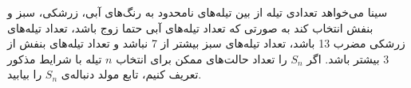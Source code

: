 \p              
  سینا می‌خواهد تعدادی تیله از بین تیله‌های نامحدود به رنگ‌های آبی، زرشکی، سبز و بنفش انتخاب کند به صورتی که تعداد تیله‌های آبی حتما زوج باشد، تعداد تیله‌های زرشکی مضرب 13 باشد، تعداد تیله‌های سبز بیشتر از 7 نباشد و تعداد تیله‌های بنفش از 3 بیشتر باشد. اگر  
  $S_n$
   را تعداد حالت‌های ممکن برای انتخاب
    $n$ 
     تیله با شرایط مذکور تعریف کنیم، تابع مولد دنباله‌ی
     $S_n$ 
     را بیابید.
